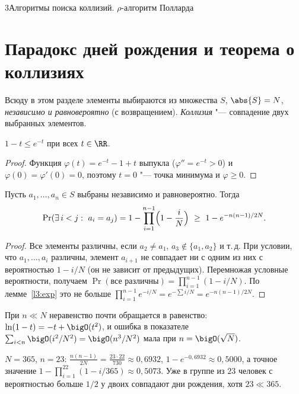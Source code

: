 \begin{lecture}{3}{Алгоритмы поиска коллизий. \texorpdfstring{$\rho$}{ρ}-алгоритм Полларда}
\section{Парадокс дней рождения и теорема о коллизиях}

Всюду в этом разделе элементы выбираются из множества $S$, $\abs{S} = N$, \emph{независимо
и равновероятно} (с возвращением). \emph{Коллизия} "--- совпадение двух выбранных элементов.

\begin{lemma}\label{l3:exp}
$1 - t \le e^{-t}$ при всех $t \in \RR$.
\end{lemma}

\begin{proof}
Функция $\varphi(t) = e^{-t} - 1 + t$ выпукла ($\varphi'' = e^{-t} > 0$) и
$\varphi(0) = \varphi'(0) = 0$, поэтому $t = 0$ "--- точка минимума и $\varphi \ge 0$.
\end{proof}

\begin{theorem}\label{l3:birthday}
Пусть $a_1, \dots, a_n \in S$ выбраны независимо и равновероятно. Тогда
\[
  \Pr(\exists\, i < j:\ a_i = a_j)
  = 1 - \prod_{i=1}^{n-1}\Bigl(1 - \frac iN\Bigr) \ \ge\ 1 - e^{-n(n-1)/2N}.
\]
\end{theorem}

\begin{proof}
Все элементы различны, если $a_2 \ne a_1$, $a_3 \notin \{a_1, a_2\}$ и т.\,д. При условии,
что $a_1, \dots, a_i$ различны, элемент $a_{i+1}$ не совпадает ни с одним из них
с вероятностью $1 - i/N$ (он не зависит от предыдущих). Перемножая условные вероятности,
получаем $\Pr(\text{все различны}) = \prod_{i=1}^{n-1} (1 - i/N)$. По
лемме~\ref{l3:exp} это не больше $\prod_{i=1}^{n-1} e^{-i/N} = e^{-\sum i / N} =
e^{-n(n-1)/2N}$.
\end{proof}

При $n \ll N$ неравенство почти обращается в равенство: $\ln(1 - t) = -t + \bigO(t^2)$,
и ошибка в показателе $\sum_{i<n} \bigO(i^2/N^2) = \bigO(n^3/N^2)$ мала при $n = \bigO(\sqrt N)$.

\begin{example}
$N = 365$, $n = 23$: $\frac{n(n-1)}{2N} = \frac{23 \cdot 22}{730} \approx 0{,}6932$,
$1 - e^{-0{,}6932} \approx 0{,}5000$, а точное значение
$1 - \prod_{i=1}^{22}(1 - i/365) \approx 0{,}5073$. Уже в группе из $23$ человек
с вероятностью больше $1/2$ у двоих совпадают дни рождения, хотя $23 \ll 365$.
\end{example}


\end{lecture}
